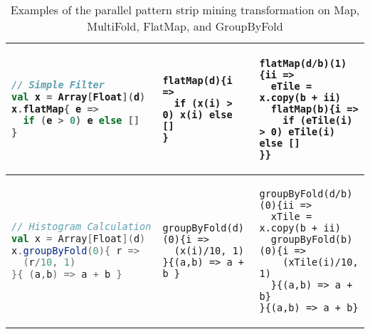 \begin{table}
\begin{tabular}{@{}lll@{}}
{\begin{lstlisting}[language=Scala,numbers=none,basicstyle=\fontsize{7}{7}\beramonott,backgroundcolor=\color{white}]
// Simple Filter
val x = Array[Float](d)
x.flatMap{ e =>
  if (e > 0) e else []
}
\end{lstlisting}}
&
{\begin{lstlisting}[language=PPLTable,numbers=none,basicstyle=\fontsize{7}{7}\beramonott,backgroundcolor=\color{white}]
flatMap(d){i =>
  if (x(i) > 0) x(i) else []
}
\end{lstlisting}}
&
{\begin{lstlisting}[language=PPLTable,numbers=none,basicstyle=\fontsize{7}{7}\beramonott,backgroundcolor=\color{white}]
flatMap(d/b)(1){ii =>
  eTile = x.copy(b + ii)
  flatMap(b){i =>
    if (eTile(i) > 0) eTile(i) else []
}}
\end{lstlisting}} \\ \midrule
{\begin{lstlisting}[language=Scala,numbers=none,basicstyle=\fontsize{7}{7}\beramonott,backgroundcolor=\color{white}]
// Histogram Calculation
val x = Array[Float](d)
x.groupByFold(0){ r =>
  (r/10, 1)
}{ (a,b) => a + b }
\end{lstlisting}}
&
{\begin{lstlisting}[language=PPLTable,numbers=none,basicstyle=\fontsize{7}{7}\beramonott,backgroundcolor=\color{white}]
groupByFold(d)(0){i =>
  (x(i)/10, 1)
}{(a,b) => a + b }
\end{lstlisting}}
&
{\begin{lstlisting}[language=PPLTable,numbers=none,basicstyle=\fontsize{7}{7}\beramonott,backgroundcolor=\color{white}]
groupByFold(d/b)(0){ii =>
  xTile = x.copy(b + ii)
  groupByFold(b)(0){i =>
    (xTile(i)/10, 1)
  }{(a,b) => a + b}
}{(a,b) => a + b}
\end{lstlisting}} \\ \bottomrule
\end{tabular}
\caption{Examples of the parallel pattern strip mining transformation on Map, MultiFold, FlatMap, and GroupByFold}
\label{table:stripmine-examples}
\end{table}
